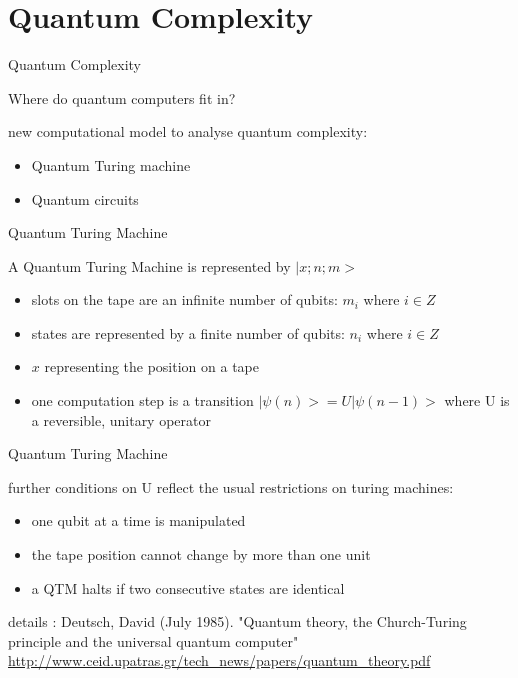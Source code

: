 \documentclass[c]{beamer}
\begin{document}
\section{Quantum Complexity}

\begin{frame}{Quantum Complexity}

Where do quantum computers fit in?

new computational model to analyse quantum complexity:
\begin{itemize}
\item Quantum Turing machine
\item Quantum circuits
\end{itemize}

\end{frame}

\begin{frame}{Quantum Turing Machine}

A Quantum Turing Machine is represented by $|x;n;m>$
\begin{itemize}
\item slots on the tape are an infinite number of qubits: $m_i$ where $i \in Z$ 
\item states are represented by a finite number of qubits: $n_i$ where $i \in Z$
\item $x$ representing the position on a tape
\item one computation step is a transition $|\psi(n)> = U|\psi(n-1)>$ where
U is a reversible, unitary operator

\end{itemize}

\end{frame}

\begin{frame}{Quantum Turing Machine}

further conditions on U reflect the usual restrictions on turing machines: 
\begin{itemize}
\item one qubit at a time is manipulated
\item the tape position cannot change by more than one unit
\item a QTM halts if two consecutive states are identical 
\end{itemize}
\medskip
\begin{footnotesize}
details : Deutsch, David (July 1985). "Quantum theory, the Church-Turing principle and the universal quantum computer"
\url{http://www.ceid.upatras.gr/tech_news/papers/quantum_theory.pdf}
\end{footnotesize}

\end{frame}
\end{document}
